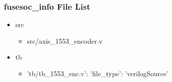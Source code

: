 \subsubsection{fusesoc\_info File List}
\begin{itemize}
\item src
	\begin{itemize}
	\item src/axis\_1553\_encoder.v
	\end{itemize}
\item tb
	\begin{itemize}
	\item {'tb/tb\_1553\_enc.v': {'file\_type': 'verilogSource'}}
	\end{itemize}
\end{itemize}
